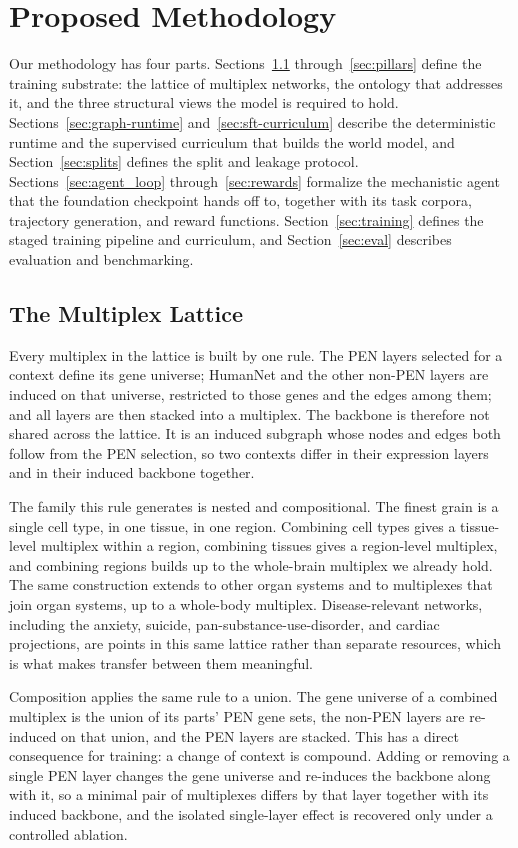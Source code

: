 \documentclass[thesis,letterpaper,12pt]{utthesis}
\begin{document}
\section{Proposed Methodology}\label{sec:methods}
Our methodology has four parts. Sections~\ref{sec:lattice} through~\ref{sec:pillars} define the training substrate: the lattice of multiplex networks, the ontology that addresses it, and the three structural views the model is required to hold. Sections~\ref{sec:graph-runtime} and~\ref{sec:sft-curriculum} describe the deterministic runtime and the supervised curriculum that builds the world model, and Section~\ref{sec:splits} defines the split and leakage protocol. Sections~\ref{sec:agent_loop} through~\ref{sec:rewards} formalize the mechanistic agent that the foundation checkpoint hands off to, together with its task corpora, trajectory generation, and reward functions. Section~\ref{sec:training} defines the staged training pipeline and curriculum, and Section~\ref{sec:eval} describes evaluation and benchmarking.

\subsection{The Multiplex Lattice}\label{sec:lattice}
Every multiplex in the lattice is built by one rule. The PEN layers selected for a context define its gene universe; HumanNet and the other non-PEN layers are induced on that universe, restricted to those genes and the edges among them; and all layers are then stacked into a multiplex. The backbone is therefore not shared across the lattice. It is an induced subgraph whose nodes and edges both follow from the PEN selection, so two contexts differ in their expression layers and in their induced backbone together.

The family this rule generates is nested and compositional. The finest grain is a single cell type, in one tissue, in one region. Combining cell types gives a tissue-level multiplex within a region, combining tissues gives a region-level multiplex, and combining regions builds up to the whole-brain multiplex we already hold. The same construction extends to other organ systems and to multiplexes that join organ systems, up to a whole-body multiplex. Disease-relevant networks, including the anxiety, suicide, pan-substance-use-disorder, and cardiac projections, are points in this same lattice rather than separate resources, which is what makes transfer between them meaningful.

Composition applies the same rule to a union. The gene universe of a combined multiplex is the union of its parts' PEN gene sets, the non-PEN layers are re-induced on that union, and the PEN layers are stacked. This has a direct consequence for training: a change of context is compound. Adding or removing a single PEN layer changes the gene universe and re-induces the backbone along with it, so a minimal pair of multiplexes differs by that layer together with its induced backbone, and the isolated single-layer effect is recovered only under a controlled ablation.
\end{document}
